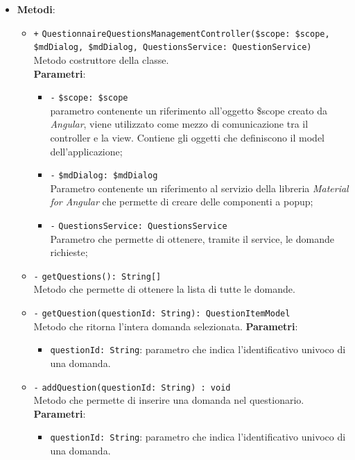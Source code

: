 \begin{itemize}
	\item \textbf{Metodi}:
	\begin{itemize}
		\item \texttt{+} \texttt{QuestionnaireQuestionsManagementController(\$scope: \$scope, \$mdDialog, \$mdDialog, QuestionsService: QuestionService)} \\Metodo costruttore della classe. \\
		\textbf{Parametri}:
		\begin{itemize}
			\item \texttt{-} \texttt{\$scope: \$scope} \\
			parametro contenente un riferimento all’oggetto \$scope creato da \textit{Angular}, viene utilizzato come mezzo di comunicazione tra il controller e la view. Contiene gli oggetti che definiscono il model dell’applicazione;
			\item \texttt{-} \texttt{\$mdDialog: \$mdDialog} \\
			Parametro contenente un riferimento al servizio della libreria \textit{Material for Angular} che permette di creare delle componenti a popup;
			\item \texttt{-} \texttt{QuestionsService: QuestionsService}\\ Parametro che permette di ottenere, tramite il service, le domande richieste;
		\end{itemize}
		\item \texttt{-} \texttt{getQuestions(): String[]} \\
		Metodo che permette di ottenere la lista di tutte le domande.
		\item \texttt{-} \texttt{getQuestion(questionId: String): QuestionItemModel} \\
		Metodo che ritorna l'intera domanda selezionata.
		\textbf{Parametri}:
		\begin{itemize}
			\item \texttt{questionId: String}: parametro che indica l'identificativo univoco di una domanda.
		\end{itemize}
		\item \texttt{-} \texttt{addQuestion(questionId: String) : void} \\
		Metodo che permette di inserire una domanda nel questionario.
		\textbf{Parametri}:
		\begin{itemize}
			\item \texttt{questionId: String}: parametro che indica l'identificativo univoco di una domanda.
		\end{itemize}
	\end{itemize}
\end{itemize}

